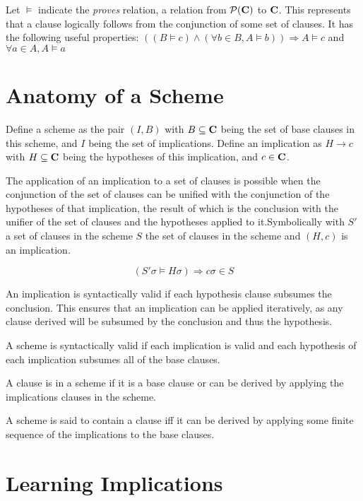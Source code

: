 \documentclass{article}
\newcommand{\allclauses}[0]{{\bf C}}
\newcommand{\powerset}[1]{{\mathcal{P}(#1)}}
\begin{document}
Let $\models$ indicate the {\it proves} relation, a relation from $\powerset{\allclauses}$ to $\allclauses$.
This represents that a clause logically follows from the conjunction of some set of clauses.
It has the following useful properties:
  $ ((B \models c) \land (\forall b \in B, A \models b)) \Rightarrow A \models c  $ and 
  $ \forall a \in A , A \models a$

\section{Anatomy of a Scheme}

Define a scheme as the pair $(I, B)$ with $B \subseteq \allclauses$ being the set of base clauses in this scheme, and $I$ being the set of implications. Define an implication as $H \rightarrow c$ with $H \subseteq \allclauses$ being the hypotheses of this implication, and $c \in \allclauses$.

The application of an implication to a set of clauses is possible when the conjunction of the set of clauses can be unified with the conjunction of the hypotheses of that implication,
the result of which is the conclusion with the unifier of the set of clauses and the hypotheses applied to it.Symbolically
with $S'$ a set of clauses in the scheme $S$ the set of clauses in the scheme and $(H,c)$ is an implication.

\begin{equation}
  (S' \sigma \models H \sigma) \Rightarrow c \sigma \in S
\end{equation}


An implication is syntactically valid if each hypothesis clause subsumes the conclusion.
This ensures that an implication can be applied iteratively, as any clause derived will be subsumed by the conclusion and thus the hypothesis.


A scheme is syntactically valid if each implication is valid and
each hypothesis of each implication subsumes all of the base clauses.

A clause is in a scheme if it is a base clause or can be derived by applying the implications clauses in the scheme.

A scheme is said to contain a clause iff it can be derived by applying some finite sequence of the 
implications to the base clauses.

\section{Learning Implications}
\end{document}
